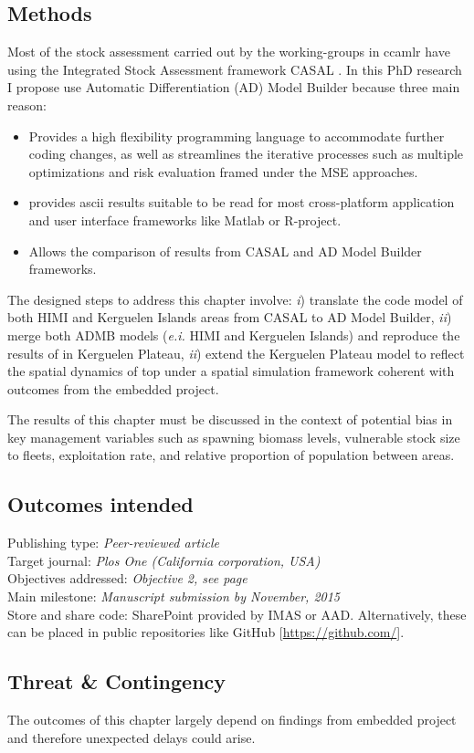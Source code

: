 \subsection*{Methods}

Most of the stock assessment carried out by the working-groups in \ac{ccamlr} have using the Integrated Stock Assessment framework CASAL \citep{candyCons2008,Ziegler2014}. In this PhD research I propose use Automatic Differentiation (AD) Model Builder \citep{Fournier2012} because three main reason:

{\small 
\begin{itemize}
        \item Provides a high flexibility programming language to accommodate further coding changes, as well as streamlines the iterative processes such as multiple optimizations and risk evaluation framed under the MSE approaches.
        \item provides ascii results suitable to be read for most cross-platform application and user interface frameworks like Matlab or R-project.
        \item Allows the comparison of results from CASAL and AD Model Builder frameworks. 
\end{itemize}
}

The designed steps to address this chapter involve: \emph{i}) translate the code model of both HIMI \citep{Ziegler2014} and Kerguelen Islands \citep{Aude2012} areas from CASAL to AD Model Builder, \emph{ii}) merge both ADMB models (\emph{e.i.} HIMI and Kerguelen Islands)  and reproduce the results of \citet{Candy2011b} in Kerguelen Plateau, \emph{ii}) extend the Kerguelen Plateau model to reflect the spatial dynamics of \acl{top} under  a spatial simulation framework coherent with outcomes from the embedded project. 

The results of this chapter must  be discussed in the context of potential bias in key management variables such as spawning biomass levels, vulnerable stock size to fleets, exploitation rate, and relative proportion of population  between areas. 


\subsection*{Outcomes intended}

Publishing type: \textit{Peer-reviewed article} \\
Target journal: \textit{Plos One (California corporation, USA)} \\
Objectives addressed: \textit{Objective 2, see page~\pageref{subsec:objetives} }\\
Main milestone: \textit{Manuscript submission by November,  2015}\\
Store and share code: SharePoint provided by IMAS or AAD. Alternatively, these can be placed in public repositories like GitHub [\url{https://github.com/}].

\subsection*{Threat \& Contingency}

The outcomes of this chapter largely depend on findings from embedded project and therefore unexpected  delays could arise. 

\vspace{11cm}
